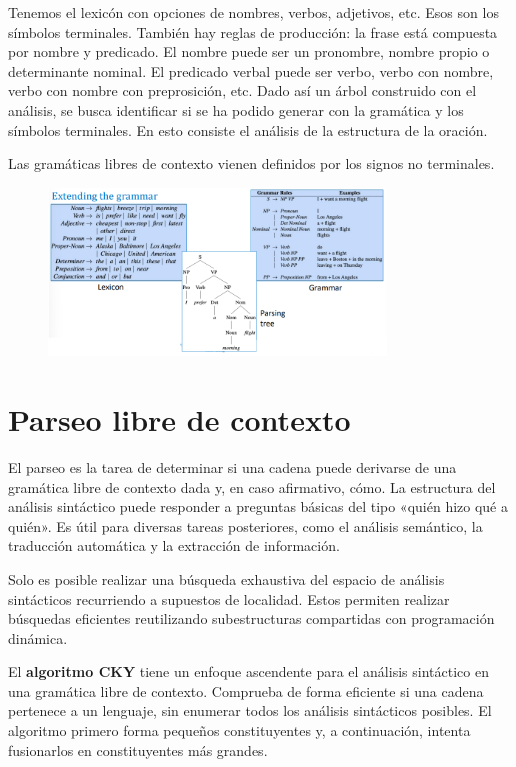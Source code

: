 Tenemos el lexicón con opciones de nombres, verbos, adjetivos, etc. Esos son los símbolos terminales. También hay reglas de producción: la frase está compuesta por nombre y predicado. El nombre puede ser un pronombre, nombre propio o determinante nominal. El predicado verbal puede ser verbo, verbo con nombre, verbo con nombre con preprosición, etc. Dado así un árbol construido con el análisis, se busca identificar si se ha podido generar con la gramática y los símbolos terminales. En esto consiste el análisis de la estructura de la oración. 

Las gramáticas libres de contexto vienen definidos por los signos no terminales.

\begin{figure}[h]
\centering
\includegraphics[width = 0.8\textwidth]{figs/grammar.png}
\end{figure}

\section{Parseo libre de contexto}
El parseo es la tarea de determinar si una cadena puede derivarse de una gramática libre de contexto dada y, en caso afirmativo, cómo. La estructura del análisis sintáctico puede responder a preguntas básicas del tipo «quién hizo qué a quién». Es útil para diversas tareas posteriores, como el análisis semántico, la traducción automática y la extracción de información.

Solo es posible realizar una búsqueda exhaustiva del espacio de análisis sintácticos recurriendo a supuestos de localidad. Estos permiten realizar búsquedas eficientes reutilizando subestructuras compartidas con programación dinámica.

El \textbf{algoritmo CKY} tiene un enfoque ascendente para el análisis sintáctico en una gramática libre de contexto. Comprueba de forma eficiente si una cadena pertenece a un lenguaje, sin enumerar todos los análisis sintácticos posibles. El algoritmo primero forma pequeños constituyentes y, a continuación, intenta fusionarlos en constituyentes más grandes.

